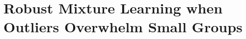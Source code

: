\chapter[Robust mixture learning]{Robust Mixture Learning when Outliers Overwhelm Small Groups}








